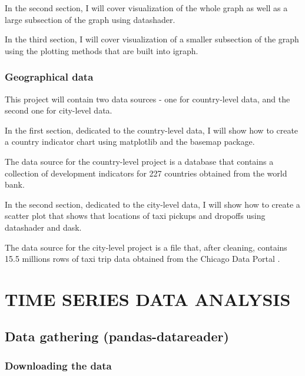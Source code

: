 \documentclass[12pt, a4paper]{article}
\begin{document}
In the second section, I will cover visualization of the whole graph as well as a large subsection of the graph using datashader.

In the third section, I will cover visualization of a smaller subsection of the graph using the plotting methods that are built into igraph.


\subsubsection{Geographical data}

This project will contain two data sources - one for country-level data, and the second one for city-level data.

In the first section, dedicated to the country-level data, I will show how to create a country indicator chart using matplotlib and the basemap package.

The data source for the country-level project is a database that contains a collection of development indicators for 227 countries obtained from the world bank\cite{world_bank_source}.

In the second section, dedicated to the city-level data, I will show how to create a scatter plot that shows that locations of taxi pickups and dropoffs using datashader and dask.

The data source for the city-level project is a file that, after cleaning, contains 15.5 millions rows of taxi trip data obtained from the Chicago Data Portal \cite{chicago_source}.

\newpage
\section{TIME SERIES DATA ANALYSIS}

\subsection{Data gathering (pandas-datareader)}

\subsubsection{Downloading the data}
\end{document}
